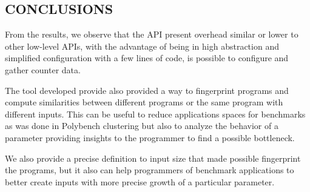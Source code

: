 
\subsection{CONCLUSIONS}

From the results, we observe that the API present overhead similar or lower to other low-level APIs, with the advantage of being in high abstraction and simplified configuration with a few lines of code, is possible to configure and gather counter data.

The tool developed provide also provided a way to fingerprint programs and compute similarities between different programs or the same program with different inputs. This can be useful to reduce applications spaces for benchmarks as was done in Polybench clustering but also to analyze the behavior of a parameter providing insights to the programmer to find a possible bottleneck.

We also provide a precise definition to input size that made possible fingerprint the programs, but it also can help programmers of benchmark applications to better create inputs with more precise growth of a particular parameter.

%





